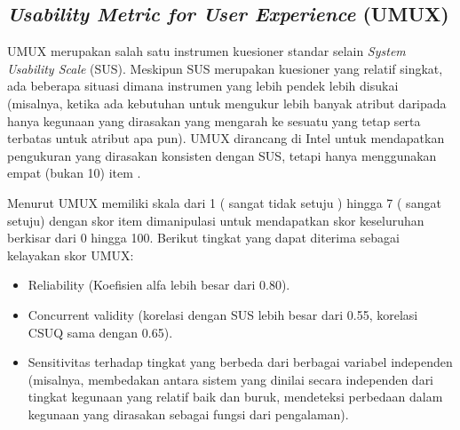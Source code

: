 \subsection{\textit{Usability Metric for User Experience} (UMUX)}
UMUX merupakan salah satu instrumen kuesioner standar selain \textit{System Usability Scale} (SUS). Meskipun SUS merupakan kuesioner yang relatif singkat, ada beberapa situasi dimana instrumen yang lebih pendek lebih disukai (misalnya, ketika ada kebutuhan untuk mengukur lebih banyak atribut daripada hanya kegunaan yang dirasakan yang mengarah ke sesuatu yang tetap serta terbatas untuk atribut apa pun). UMUX dirancang di Intel untuk mendapatkan pengukuran yang dirasakan konsisten dengan SUS, tetapi hanya menggunakan empat (bukan 10) item \citep{lewis2018measuring}.

\begin{table}[H]
\caption{Daftar Pertanyaan Metode UMUX menurut \citep{lewis2018measuring}.}
\label{tab:UMUX}
\end{table}

\par Menurut \citep{lewis2018measuring} UMUX memiliki skala dari 1 ( sangat tidak setuju ) hingga 7 ( sangat setuju) dengan skor item dimanipulasi untuk mendapatkan skor keseluruhan berkisar dari 0 hingga 100. Berikut tingkat yang dapat diterima sebagai kelayakan skor UMUX:

\begin{itemize}
\item Reliability (Koefisien alfa lebih besar dari 0.80).

\item Concurrent validity (korelasi dengan SUS lebih besar dari 0.55, korelasi CSUQ sama dengan 0.65).

\item Sensitivitas terhadap tingkat yang berbeda dari berbagai variabel independen (misalnya, membedakan antara sistem yang dinilai secara independen dari tingkat kegunaan yang relatif baik dan buruk, mendeteksi perbedaan dalam kegunaan yang dirasakan sebagai fungsi dari pengalaman).

\end{itemize}

